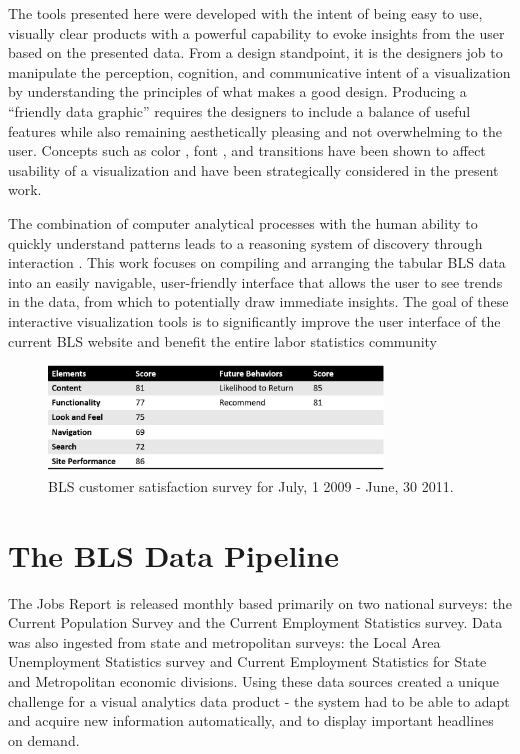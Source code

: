 \documentclass{sigchi}
\begin{document}
The tools presented here were developed with the intent of being easy to use, visually clear products with a powerful capability to evoke insights from the user based on the presented data. From a design standpoint, it is the designers job to manipulate the perception, cognition, and communicative intent of a visualization \cite{agrawala2011design} by understanding the principles of what makes a good design. Producing a ``friendly data graphic'' \cite{tufte1983visual} requires the designers to include a balance of useful features while also remaining aesthetically pleasing and not overwhelming to the user. Concepts such as color \cite{macdonald1999using}, font \cite{moere2011role}, and transitions \cite{heer2007animated} have been shown to affect usability of a visualization and have been strategically considered in the present work.

The combination of computer analytical processes with the human ability to quickly understand patterns leads to a reasoning system of discovery through interaction \cite{green_visual_2008}. This work focuses on compiling and arranging the tabular BLS data into an easily navigable, user-friendly interface that allows the user to see trends in the data, from which to potentially draw immediate insights. The goal of these interactive visualization tools is to significantly improve the user interface of the current BLS website and benefit the entire labor statistics community

\begin{figure}[t]
    \includegraphics[width = 3.5in]{figures/BLSSurvey_ppt.png}
    \caption{BLS customer satisfaction survey for July, 1 2009 - June, 30 2011.}
    \label{CustSat}
\end{figure}

\section{The BLS Data Pipeline}

The Jobs Report is released monthly based primarily on two national surveys: the Current Population Survey and the Current Employment Statistics survey. Data was also ingested from state and metropolitan surveys: the Local Area Unemployment Statistics survey and Current Employment Statistics for State and Metropolitan economic divisions. Using these data sources created a unique challenge for a visual analytics data product - the system had to be able to adapt and acquire new information automatically, and to display important headlines on demand.
\end{document}
